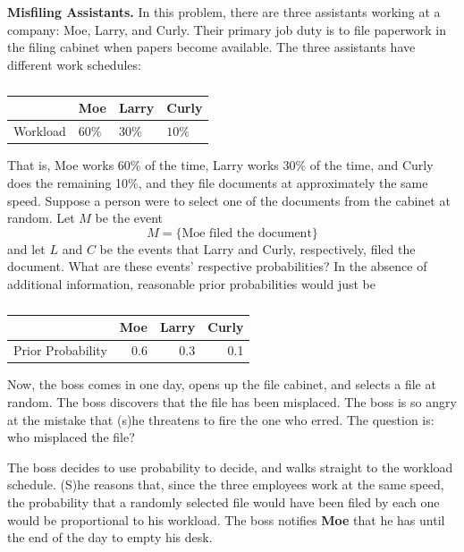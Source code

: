 \documentclass[captions=tableheading]{scrbook}
\begin{document}
\begin{example}
\textbf{Misfiling Assistants.} In this problem, there are three assistants working at a company: Moe, Larry, and Curly. Their primary job duty is to file paperwork in the filing cabinet when papers become available. The three assistants have different work schedules:

\begin{table}[htb]
\caption[Misfiling assistants: workload]{} \label{exa-misfiling-assistants}
\begin{center}
\begin{tabular}{llll}
           &  Moe       &  Larry     &  Curly     \\
\hline
 Workload  &  \(60\%\)  &  \(30\%\)  &  \(10\%\)  \\
\end{tabular}
\end{center}
\end{table}


That is, Moe works 60\% of the time, Larry works 30\% of the time, and Curly does the remaining 10\%, and they file documents at approximately the same speed. Suppose a person were to select one of the documents from the cabinet at random. Let \(M\) be the event
\[
M= \{ \mbox{Moe filed the document} \}
\]
and let \(L\) and \(C\) be the events that Larry and Curly, respectively, filed the document. What are these events' respective probabilities? In the absence of additional information, reasonable prior probabilities would just be

\begin{table}[htb]
\caption[Misfiling assistants: prior]{} 
\begin{center}
\begin{tabular}{lrrr}
                    &  Moe  &  Larry  &  Curly  \\
\hline
 Prior Probability  &  0.6  &    0.3  &    0.1  \\
\end{tabular}
\end{center}
\end{table}


Now, the boss comes in one day, opens up the file cabinet, and selects a file at random. The boss discovers that the file has been misplaced. The boss is so angry at the mistake that (s)he threatens to fire the one who erred. The question is: who misplaced the file?

The boss decides to use probability to decide, and walks straight to the workload schedule. (S)he reasons that, since the three employees work at the same speed, the probability that a randomly selected file would have been filed by each one would be proportional to his workload. The boss notifies \textbf{Moe} that he has until the end of the day to empty his desk.


\end{example}
\end{document}
